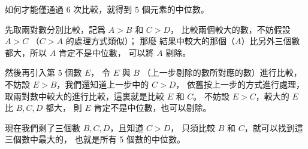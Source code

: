 \startEXERCISE
如何才能僅通過 $6$ 次比較，就得到 $5$ 個元素的中位數。
\stopEXERCISE

\startANSWER
先取兩對數分別比較，記爲 $A>B$ 和 $C>D$，
比較兩個較大的數，不妨假設 $A>C$ （$C>A$ 的處理方式類似）；
那麼 結果中較大的那個（$A$）比另外三個數都大，所以 $A$ 肯定不是中位數，
可以將 $A$ 剔除。

然後再引入第 5 個數 $E$，
令 $E$ 與 $B$ （上一步剔除的數所對應的數）進行比較，
不妨設 $E>B$，我們還知道上一步中的 $C>D$，
依舊按上一步的方式進行處理，
取兩對數中較大的進行比較，這裏就是比較 $E$ 和 $C$。
不妨設 $E>C$，較大的 $E$ 比 $B,C,D$ 都大，
則 $E$ 肯定不是中位數，也可以剔除。

現在我們剩了三個數 $B,C,D$，且知道 $C>D$，
只須比較 $B$ 和 $C$，就可以找到這三個數中最大的，
也就是所有 5 個數的中位數。
\stopANSWER
